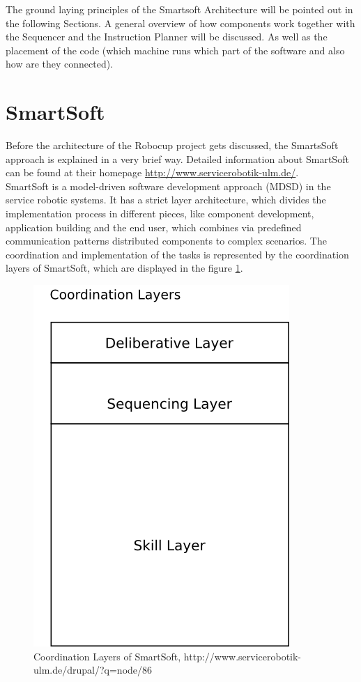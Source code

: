 The ground laying principles of the Smartsoft Architecture will be pointed out in the following
Sections. A general overview of how components work together with the Sequencer and the Instruction Planner will be discussed.
As well as the placement of the code (which machine runs which part of the software and also how are they connected).

\section{SmartSoft}
Before the architecture of the Robocup project gets discussed, the SmartsSoft approach is explained in a very brief way. Detailed information about SmartSoft can be found at their homepage \url{http://www.servicerobotik-ulm.de/}.
\\
SmartSoft is a model-driven software development approach (MDSD) in the service robotic systems. It has a strict layer architecture, which divides the implementation process in different pieces, like component development, application building and the end user, which combines via predefined communication patterns distributed components to complex scenarios.
The coordination and implementation of the tasks is represented by the coordination layers of SmartSoft, which are displayed in the figure \ref{fig:architecture_smartsoft_layers}.

\begin{figure}[h]
\centering
\includegraphics[scale=1.0]{pic/coordination_layers_smartsoft.png}
\caption{Coordination Layers of SmartSoft, http://www.servicerobotik-ulm.de/drupal/?q=node/86}
\label{fig:architecture_smartsoft_layers}
\end{figure}

